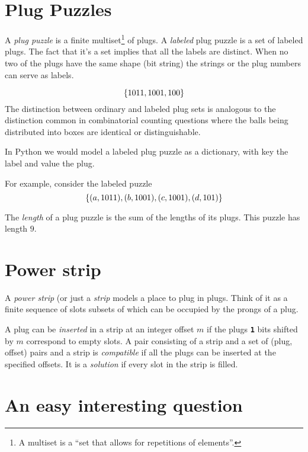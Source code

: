 \documentclass[10pt]{article}
\numberwithin{equation}{section}
\newcommand{\plug}[1]{%
\mbox{{\textbf\texttt #1}}
}
\begin{document}
\section{Plug Puzzles}

A \emph{plug puzzle} is a finite multiset\footnote{A multiset is a
  ``set that allows for repetitions of elements''.}
 of plugs. A \emph{labeled} plug puzzle is a set of labeled
 plugs. The fact that it's a set implies that all the labels are
 distinct. When no two of the plugs have the same shape (bit string)
 the strings or the plug numbers can serve as labels.

 \begin{equation*}
\{\plug{1011}, \plug{1001}, \plug{100} \}
\end{equation*}
 The distinction between ordinary and labeled plug sets is analogous
 to the distinction common in combinatorial counting questions where
 the balls being distributed into boxes are identical or
 distinguishable.

 In Python we would model a labeled plug puzzle as a dictionary, with
 key the label and value the plug.

 For example, consider the labeled puzzle
 \begin{equation*}
   \{ (a, \plug{1011}),
   (b,\plug{1001}),
   (c, \plug{1001}),
   (d, \plug{101}) \}
\end{equation*}

 The \emph{length} of a plug puzzle is the sum of the lengths of its
 plugs. This puzzle has length $9$.
 
 \section{Power strip}

 A \emph{power strip} (or just a \emph{strip} models a place to plug
 in plugs. Think of it as a finite sequence of slots subsets of which
 can  be occupied by the prongs of a plug. 

 A plug can be \emph{inserted} in a strip at an integer offset $m$ if
 the plugs   \plug{1} bits shifted by $m$ correspond to empty slots.
 A pair consisting of a strip and a set of (plug, offset) pairs
 and a strip is \emph{compatible} if all the plugs can be inserted at
 the specified offsets. It is a \emph{solution} if
 every slot in the strip is filled.

 \section{An easy interesting question}
\end{document}
